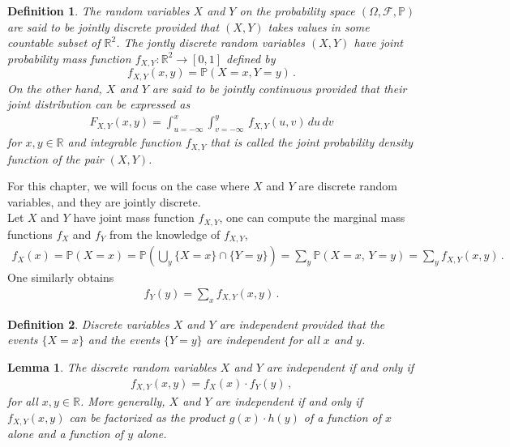 \documentclass[11pt, onesided]{book}
\theoremstyle{break}
\theoremstyle{break}
\newtheorem{lem}{Lemma}[thm]
\newtheorem{defn}{Definition}[thm]
\newcommand{\R}{\mathbb{R}}
\begin{document}
\begin{defn}
The random variables $X$ and $Y$ on the probability space $(\Omega, \mathcal{F}, \mathbb{P})$ are said to be jointly discrete provided that $(X,Y)$ takes values in some countable subset of $\R^2$. The jontly discrete random variables $(X,Y)$ have joint probability mass function $f_{X,Y}:\R^2 \to [0,1]$ defined by $$f_{X,Y}(x,y) = \mathbb{P}(X=x,Y=y)\,.$$ On the other hand, $X$ and $Y$ are said to be jointly continuous provided that their joint distribution can be expressed as
\begin{align*}
F_{X,Y}(x,y) = \int_{u=-\infty}^x \int_{v=-\infty}^y\, f_{X,Y}(u,v) \, du\, dv
\end{align*}
for $x, y\in \R$ and integrable function $f_{X,Y}$ that is called the joint probability density function of the pair $(X,Y)$. 
\end{defn}

For this chapter, we will focus on the case where $X$ and $Y$ are discrete random variables, and they are jointly discrete. \\


Let $X$ and $Y$ have joint mass function $f_{X,Y}$, one can compute the marginal mass functions $f_X$ and $f_Y$ from the knowledge of $f_{X,Y}$,
\begin{align*}
f_X(x) = \mathbb{P}(X=x) = \mathbb{P}\left( \bigcup_y \{ X = x\} \cap \{Y= y\}\right) = \sum_{y}\mathbb{P}(X=x,\, Y=y) = \sum_y f_{X,Y}(x,y)\,.
\end{align*}
One similarly obtains
\begin{align*}
f_Y(y) = \sum_{x}f_{X,Y}(x,y)\,.
\end{align*}

\begin{defn}
Discrete variables $X$ and $Y$ are independent provided that the events $\{X = x\}$ and the events $\{Y= y\}$ are independent for all $x$ and $y$. 
\end{defn}

\begin{lem}
The discrete random variables $X$ and $Y$ are independent if and only if 
\begin{align*}
f_{X,Y}(x,y) = f_X(x) \cdot f_Y(y)\,,
\end{align*}
for all $x,y \in \R$. More generally, $X$ and $Y$ are independent if and only if $f_{X,Y}(x,y)$ can be factorized as the product $g(x)\cdot h(y)$ of a function of $x$ alone and a function of $y$ alone.  
\end{lem}
\end{document}
